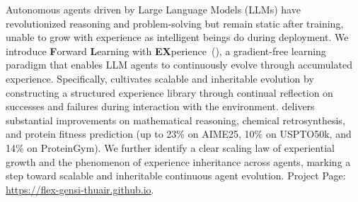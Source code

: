 Autonomous agents driven by Large Language Models (LLMs) have revolutionized reasoning and problem-solving but remain static after training, unable to grow with experience as intelligent beings do during deployment.
We introduce \textbf{F}orward \textbf{L}earning with \textbf{EX}perience~(\method{}), a gradient-free learning paradigm that enables LLM agents to continuously evolve through accumulated experience.
Specifically, \method{} cultivates scalable and inheritable evolution by constructing a structured experience library through continual reflection on successes and failures during interaction with the environment.
\method{} delivers substantial improvements on mathematical reasoning, chemical retrosynthesis, and protein fitness prediction (up to 23\% on AIME25, 10\% on USPTO50k, and 14\% on ProteinGym).
We further identify a clear scaling law of experiential growth and the phenomenon of experience inheritance across agents, marking a step toward scalable and inheritable continuous agent evolution.
Project Page: \url{https://flex-gensi-thuair.github.io}.